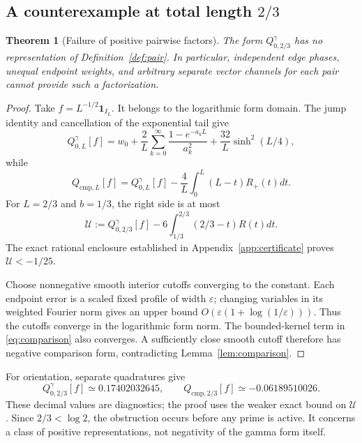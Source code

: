 \documentclass[11pt]{article}
\numberwithin{equation}{section}
\newtheorem{theorem}{Theorem}[section]
\theoremstyle{definition}
\theoremstyle{remark}
\newcommand{\Qgam}{Q^{\gamma}}
\begin{document}
\subsection{A counterexample at total length \texorpdfstring{$2/3$}{2/3}}

\begin{theorem}[Failure of positive pairwise factors]\label{thm:pair}
The form $\Qgam_{0,2/3}$ has no representation of
Definition~\ref{def:pair}. In particular, independent edge phases,
unequal endpoint weights, and arbitrary separate vector channels for
each pair cannot provide such a factorization.
\end{theorem}

\begin{proof}
Take $f=L^{-1/2}\mathbf1_{I_L}$. It belongs to the logarithmic form
domain. The jump identity and cancellation of the exponential tail give
\begin{equation}
\Qgam_{0,L}[f]=w_0+\frac2L\sum_{k=0}^\infty
\frac{1-e^{-a_kL}}{a_k^2}
+\frac{32}{L}\sinh^2(L/4),
\label{eq:constantgamma}
\end{equation}
while
\begin{equation}
Q_{\mathrm{cmp},L}[f]
=\Qgam_{0,L}[f]-\frac4L\int_0^L(L-t)R_+(t)dt.
\label{eq:constantcmp}
\end{equation}
For $L=2/3$ and $b=1/3$, the right side is at most
\begin{equation}
\mathcal U:=\Qgam_{0,2/3}[f]
-6\int_{1/3}^{2/3}(2/3-t)R(t)dt.
\label{eq:U}
\end{equation}
The exact rational enclosure established in
Appendix~\ref{app:certificate} proves $\mathcal U<-1/25$.

Choose nonnegative smooth interior cutoffs converging to the constant.
Each endpoint error is a scaled fixed profile of width $\varepsilon$;
changing variables in its weighted Fourier norm gives an upper bound
$O(\varepsilon(1+\log(1/\varepsilon)))$. Thus the cutoffs converge in
the logarithmic form norm. The bounded-kernel term in
\eqref{eq:comparison} also converges. A sufficiently close smooth cutoff
therefore has negative comparison form, contradicting
Lemma~\ref{lem:comparison}.
\end{proof}

For orientation, separate quadratures give
\[
\Qgam_{0,2/3}[f]\simeq0.17402032645,
\qquad Q_{\mathrm{cmp},2/3}[f]\simeq-0.06189510026.
\]
These decimal values are diagnostics; the proof uses the weaker exact
bound on $\mathcal U$. Since $2/3<\log2$, the obstruction occurs before
any prime is active. It concerns a class of positive representations,
not negativity of the gamma form itself.
\end{document}
